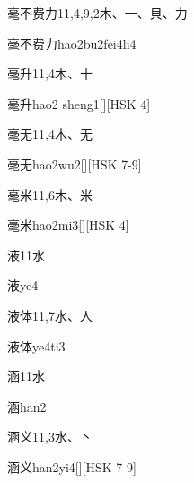 \begin{Entry}{毫不费力}{11,4,9,2}{⽊、⼀、⾙、⼒}
  \begin{Phonetics}{毫不费力}{hao2bu2fei4li4}
  \end{Phonetics}
\end{Entry}

\begin{Entry}{毫升}{11,4}{⽊、⼗}
  \begin{Phonetics}{毫升}{hao2 sheng1}[][HSK 4]
  \end{Phonetics}
\end{Entry}

\begin{Entry}{毫无}{11,4}{⽊、⽆}
  \begin{Phonetics}{毫无}{hao2wu2}[][HSK 7-9]
  \end{Phonetics}
\end{Entry}

\begin{Entry}{毫米}{11,6}{⽊、⽶}
  \begin{Phonetics}{毫米}{hao2mi3}[][HSK 4]
  \end{Phonetics}
\end{Entry}

\begin{Entry}{液}{11}{⽔}
  \begin{Phonetics}{液}{ye4}
  \end{Phonetics}
\end{Entry}

\begin{Entry}{液体}{11,7}{⽔、⼈}
  \begin{Phonetics}{液体}{ye4ti3}
  \end{Phonetics}
\end{Entry}

\begin{Entry}{涵}{11}{⽔}
  \begin{Phonetics}{涵}{han2}
  \end{Phonetics}
\end{Entry}

\begin{Entry}{涵义}{11,3}{⽔、⼂}
  \begin{Phonetics}{涵义}{han2yi4}[][HSK 7-9]
  \end{Phonetics}
\end{Entry}


